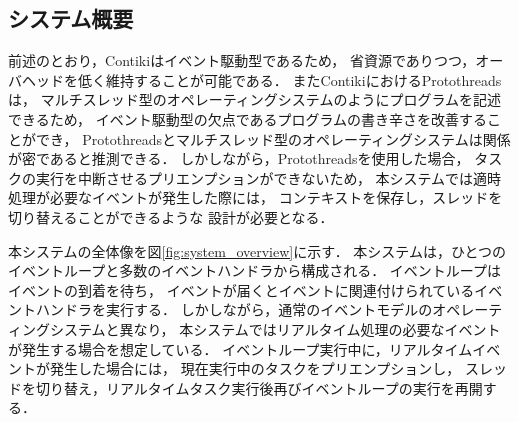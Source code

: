 \subsection{システム概要}
前述のとおり，Contikiはイベント駆動型であるため，
省資源でありつつ，オーバヘッドを低く維持することが可能である．
またContikiにおけるProtothreadsは，
マルチスレッド型のオペレーティングシステムのようにプログラムを記述できるため，
イベント駆動型の欠点であるプログラムの書き辛さを改善することができ，
Protothreadsとマルチスレッド型のオペレーティングシステムは関係が密であると推測できる．
しかしながら，Protothreadsを使用した場合，
タスクの実行を中断させるプリエンプションができないため，
本システムでは適時処理が必要なイベントが発生した際には，
コンテキストを保存し，スレッドを切り替えることができるような
設計が必要となる．

本システムの全体像を図\ref{fig:system_overview}に示す．
本システムは，ひとつのイベントループと多数のイベントハンドラから構成される．
イベントループはイベントの到着を待ち，
イベントが届くとイベントに関連付けられているイベントハンドラを実行する．
しかしながら，通常のイベントモデルのオペレーティングシステムと異なり，
本システムではリアルタイム処理の必要なイベントが発生する場合を想定している．
イベントループ実行中に，リアルタイムイベントが発生した場合には，
現在実行中のタスクをプリエンプションし，
スレッドを切り替え，リアルタイムタスク実行後再びイベントループの実行を再開する．










